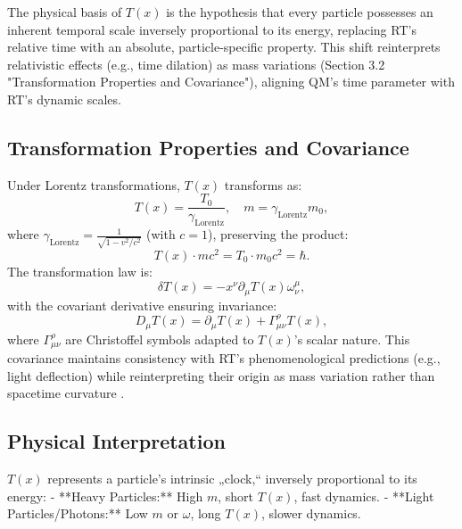 \documentclass[twocolumn,aps,prl]{revtex4-2}
\newcommand{\Tfield}{T(x)}
\newcommand{\Tzero}{T_0}
\newcommand{\gammaf}{\gamma_{\text{Lorentz}}}
\begin{document}
	The physical basis of \(\Tfield\) is the hypothesis that every particle possesses an inherent temporal scale inversely proportional to its energy, replacing RT’s relative time with an absolute, particle-specific property. This shift reinterprets relativistic effects (e.g., time dilation) as mass variations (Section 3.2 "Transformation Properties and Covariance"), aligning QM’s time parameter with RT’s dynamic scales.
	
	\subsection{Transformation Properties and Covariance}
	\label{subsec:transformations}
	
	Under Lorentz transformations, \(\Tfield\) transforms as:
	\begin{equation}
		\Tfield = \frac{\Tzero}{\gammaf}, \quad m = \gammaf m_0,
		\label{eq:transform}
	\end{equation}
	where \(\gammaf = \frac{1}{\sqrt{1 - v^2/c^2}}\) (with \(c = 1\)), preserving the product:
	\begin{equation}
		\Tfield \cdot m c^2 = \Tzero \cdot m_0 c^2 = \hbar.
		\label{eq:invariant_product}
	\end{equation}
	The transformation law is:
	\begin{equation}
		\delta\Tfield = -x^{\nu}\partial_{\mu}\Tfield\omega_{\nu}^{\mu},
		\label{eq:lorentz_transform}
	\end{equation}
	with the covariant derivative ensuring invariance:
	\begin{equation}
		D_{\mu}\Tfield = \partial_{\mu}\Tfield + \Gamma_{\mu\nu}^{\rho}\Tfield,
		\label{eq:covariant_derivative}
	\end{equation}
	where \(\Gamma_{\mu\nu}^{\rho}\) are Christoffel symbols adapted to \(\Tfield\)’s scalar nature. This covariance maintains consistency with RT’s phenomenological predictions (e.g., light deflection) while reinterpreting their origin as mass variation rather than spacetime curvature \cite{pascher_lagrange_2025}.
	
	\subsection{Physical Interpretation}
	\label{subsec:time_interpretation}
	
	\(\Tfield\) represents a particle’s intrinsic „clock,“ inversely proportional to its energy:
	- **Heavy Particles:** High \(m\), short \(\Tfield\), fast dynamics.
	- **Light Particles/Photons:** Low \(m\) or \(\omega\), long \(\Tfield\), slower dynamics.
	
\end{document}
